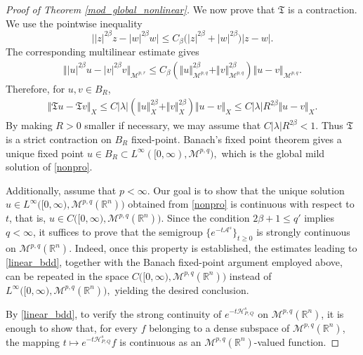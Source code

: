 \documentclass[12pt, reqno]{amsart}
\theoremstyle{definition}
\theoremstyle{remark}
\numberwithin{equation}{section}
\begin{document}
\begin{proof}[Proof of Theorem \ref{mod_global_nonlinear}]
We now prove that $\mathfrak T$ is a contraction. We use the pointwise inequality
\[
    \big|
    |z|^{2\beta}z-|w|^{2\beta}w
    \big|
    \leq
    C_\beta
    \big(|z|^{2\beta}+|w|^{2\beta}\big)|z-w|.
\]
The corresponding multilinear estimate gives
\begin{equation}
\label{nonlinear_diff_mod_est}
\begin{aligned}
\Vert
|u|^{2\beta}u-|v|^{2\beta}v
\Vert_{\mathcal M^{p,r}}
\leq
C_\beta
\left(
\Vert u\Vert_{\mathcal M^{p,q}}^{2\beta}
+
\Vert v\Vert_{\mathcal M^{p,q}}^{2\beta}
\right)
\Vert u-v\Vert_{\mathcal M^{p,q}}.
\end{aligned}
\end{equation}
Therefore, for $u,v\in B_R$,
\[
\begin{aligned}
    \Vert \mathfrak T u-\mathfrak T v\Vert_X
    \leq
    C|\lambda|
    \left(
    \Vert u\Vert_X^{2\beta}
    +
    \Vert v\Vert_X^{2\beta}
    \right)
    \Vert u-v\Vert_X
\leq
    C|\lambda|R^{2\beta}
    \Vert u-v\Vert_X.
\end{aligned}
\]
By making $R>0$ smaller if necessary, we may assume that $C|\lambda|R^{2\beta}<1.$
Thus $\mathfrak T$ is a strict contraction on $B_R$ fixed-point. Banach's fixed point theorem gives a unique fixed point $u\in B_R\subset L^\infty([0,\infty),\mathcal M^{p,q}),$
which is the global mild solution of \eqref{nonpro}.

Additionally, assume that $p<\infty$. Our goal is to show that the unique solution $u\in L^{\infty}\bigl([0,\infty),\mathcal{M}^{p,q}(\mathbb{R}^n)\bigr)$
obtained from \eqref{nonpro} is continuous with respect to $t$, that is, $u\in C\bigl([0,\infty),\mathcal{M}^{p,q}(\mathbb{R}^n)\bigr).$
Since the condition $2\beta+1\leq q'$ implies $q<\infty$, it suffices to prove that the semigroup $\{e^{-t\mathcal{A}^s}\}_{t\geq 0}$ is strongly continuous on $\mathcal{M}^{p,q}(\mathbb{R}^n)$. Indeed, once this property is established, the estimates leading to \eqref{linear_bdd}, together with the Banach fixed-point argument employed above, can be repeated in the space $C\bigl([0,\infty),\mathcal{M}^{p,q}(\mathbb{R}^n)\bigr)$
instead of $L^{\infty}\bigl([0,\infty),\mathcal{M}^{p,q}(\mathbb{R}^n)\bigr),$
yielding the desired conclusion.

By \eqref{linear_bdd}, to verify the strong continuity of $e^{-t\mathcal{H}_{P, Q}^s}$ on $\mathcal{M}^{p,q}(\mathbb{R}^n)$, it is enough to show that, for every $f$ belonging to a dense subspace of $\mathcal{M}^{p,q}(\mathbb{R}^n)$, the mapping $ t\longmapsto e^{-t\mathcal{H}_{P, Q}^s}f $
is continuous as an $\mathcal{M}^{p,q}(\mathbb{R}^n)$-valued function.


\end{proof}
\end{document}
